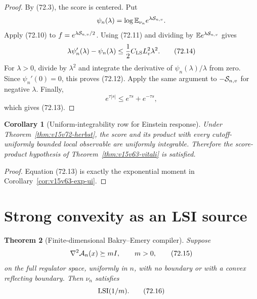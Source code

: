 \documentclass[11pt]{article}
\newtheorem{theorem}{Theorem}[section]
\newtheorem{corollary}[theorem]{Corollary}
\theoremstyle{remark}
\begin{document}
\begin{proof}
By (72.3), the score is centered.  Put
\[
 \psi_n(\lambda)
 =
 \log\mathbb E_{\nu_n}e^{\lambda{\cal S}_{n,v}}.
\]
Apply (72.10) to
\(f=e^{\lambda{\cal S}_{n,v}/2}\).  Using (72.11) and dividing by
\(\mathbb E e^{\lambda{\cal S}_{n,v}}\) gives
\[
 \lambda\psi_n'(\lambda)-\psi_n(\lambda)
 \leq
 \frac12C_{\rm LS}L_v^2\lambda^2.                    \tag{72.14}
\]
For \(\lambda>0\), divide by \(\lambda^2\) and integrate the
derivative of \(\psi_n(\lambda)/\lambda\) from zero.  Since
\(\psi_n'(0)=0\), this proves (72.12).  Apply the same argument to
\(-{\cal S}_{n,v}\) for negative \(\lambda\).  Finally,
\[
 e^{\tau|s|}\leq e^{\tau s}+e^{-\tau s},
\]
which gives (72.13).
\end{proof}

\begin{corollary}[Uniform-integrability row for Einstein response]
\label{cor:v15v72-ui}
Under Theorem~\ref{thm:v15v72-herbst}, the score and its product
with every cutoff-uniformly bounded local observable are uniformly
integrable.  Therefore the score-product hypothesis of
Theorem~\ref{thm:v15v63-vitali} is satisfied.
\end{corollary}

\begin{proof}
Equation (72.13) is exactly the exponential moment in
Corollary~\ref{cor:v15v63-exp-ui}.
\end{proof}

\section{Strong convexity as an LSI source}

\begin{theorem}[Finite-dimensional Bakry--Emery compiler]
\label{thm:v15v72-bakry}
Suppose
\[
 \nabla^2{\cal A}_n(x)\succeq mI,\qquad m>0,           \tag{72.15}
\]
on the full regulator space, uniformly in \(n\), with no boundary
or with a convex reflecting boundary.  Then \(\nu_n\) satisfies
\[
 {\rm LSI}(1/m).                                      \tag{72.16}
\]
\end{theorem}
\end{document}
